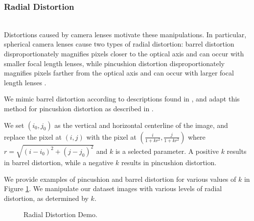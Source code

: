 \documentclass[pageno]{cos429}
\begin{document}
\subsubsection{Radial Distortion}\hspace*{\fill} \\
Distortions caused by camera lenses motivate these manipulations. In particular, spherical camera lenses cause two types of radial distortion: barrel distortion disproportionately magnifies pixels closer to the optical axis and can occur with smaller focal length lenses, while pincushion distortion disproportionately magnifies pixels farther from the optical axis and can occur with larger focal length lenses \cite{drap_exact_2016}.

We mimic barrel distortion according to descriptions found in \cite{gribbon_real-time_2003}, and adapt this method for pincushion distortion as described in \cite{drap_exact_2016}.

We set $(i_0,j_0)$ as the vertical and horizontal centerline of the image, and replace the pixel at $(i,j)$ with the pixel at $(\frac{i}{1+kr^2},\frac{j}{1+kr^2})$ where $r=\sqrt{(i-i_0)^2+(j-j_0)^2}$ and $k$ is a selected parameter. A positive $k$ results in barrel distortion, while a negative $k$ results in pincushion distortion.

We provide examples of pincushion and barrel distortion for various values of $k$ in Figure \ref{fig:manipulationdemo_radial}. We manipulate our dataset images with various levels of radial distortion, as determined by $k$.

\begin{figure}[!htb]
\caption{Radial Distortion Demo.}
\label{fig:manipulationdemo_radial}
\end{figure}
\end{document}
